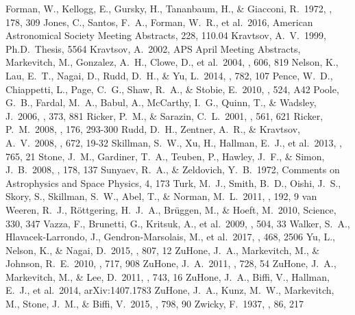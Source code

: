 \documentclass{emulateapj}
\begin{document}
\begin{thebibliography}{}
 Forman, W., Kellogg, E., Gursky, H., Tananbaum, H., \& Giacconi, R.\ 1972, \apj, 178, 309
 Jones, C., Santos, F.~A., Forman, W.~R., et al.\ 2016, American Astronomical Society Meeting Abstracts, 228, 110.04 
 Kravtsov, A.~V.\ 1999, Ph.D.~Thesis, 5564 
 Kravtsov, A.\ 2002, APS April Meeting Abstracts,  
 Markevitch, M., Gonzalez, A.~H., Clowe, D., et al.\ 2004, \apj, 606, 819
 Nelson, K., Lau, E.~T., Nagai, D., Rudd, D.~H., \& Yu, L.\ 2014, \apj, 782, 107 
 Pence, W.~D., Chiappetti, L., Page, C.~G., Shaw, R.~A., \& Stobie, E.\ 2010, \aap, 524, A42
 Poole, G.~B., Fardal, M.~A., Babul, A., McCarthy, I.~G., Quinn, T., \& Wadsley, J.\ 2006, \mnras, 373, 881
 Ricker, P.~M., \& Sarazin, C.~L.\ 2001, \apj, 561, 621
 Ricker, P.~M.\ 2008, \apjs, 176, 293-300
 Rudd, D.~H., Zentner, A.~R., \& Kravtsov, A.~V.\ 2008, \apj, 672, 19-32 
 Skillman, S.~W., Xu, H., Hallman, E.~J., et al.\ 2013, \apj, 765, 21
 Stone, J.~M., Gardiner, T.~A., Teuben, P., Hawley, J.~F., \& Simon, J.~B.\ 2008, \apjs, 178, 137
 Sunyaev, R.~A., \& Zeldovich, Y.~B.\ 1972, Comments on Astrophysics and Space Physics, 4, 173
 Turk, M.~J., Smith, B.~D., Oishi, J.~S., Skory, S., Skillman, S.~W., Abel, T., \& Norman, M.~L.\ 2011, \apjs, 192, 9
 van Weeren, R.~J., R{\"o}ttgering, H.~J.~A., Br{\"u}ggen, M., \& Hoeft, M.\ 2010, Science, 330, 347
 Vazza, F., Brunetti, G., Kritsuk, A., et al.\ 2009, \aap, 504, 33
 Walker, S.~A., Hlavacek-Larrondo, J., Gendron-Marsolais, M., et al.\ 2017, \mnras, 468, 2506 
 Yu, L., Nelson, K., \& Nagai, D.\ 2015, \apj, 807, 12
 ZuHone, J.~A., Markevitch, M., \& Johnson, R.~E.\ 2010, \apj, 717, 908
 ZuHone, J.~A.\ 2011, \apj, 728, 54
 ZuHone, J.~A., Markevitch, M., \& Lee, D.\ 2011, \apj, 743, 16
 ZuHone, J.~A., Biffi, V., Hallman, E.~J., et al.\ 2014, arXiv:1407.1783
 ZuHone, J.~A., Kunz, M.~W., Markevitch, M., Stone, J.~M., \& Biffi, V.\ 2015, \apj, 798, 90
 Zwicky, F.\ 1937, \apj, 86, 217
\end{thebibliography}{}
\end{document}
